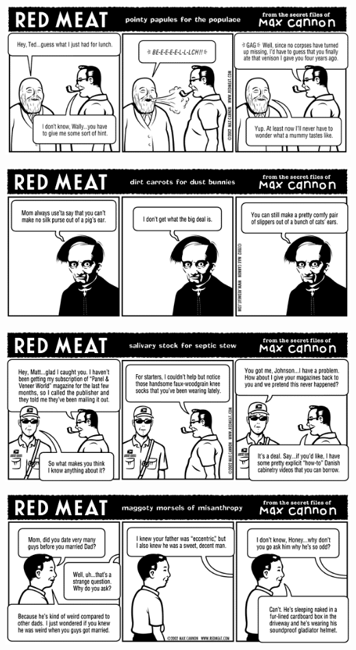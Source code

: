 \documentclass[a4paper,twoside,11pt]{article}
\begin{document}
\includegraphics[width=\textwidth]{redmeat_2002-08-06.png}



\includegraphics[width=\textwidth]{redmeat_2002-08-13.png}



\includegraphics[width=\textwidth]{redmeat_2002-08-20.png}



\includegraphics[width=\textwidth]{redmeat_2002-08-27.png}
\end{document}

